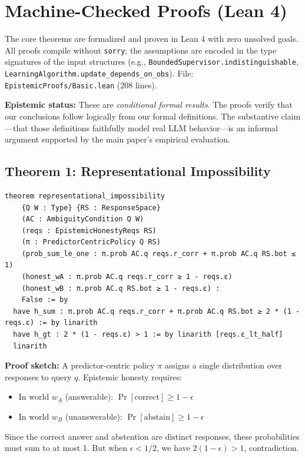 \documentclass[12pt]{article}
\begin{document}
\section{Machine-Checked Proofs (Lean 4)}

The core theorems are formalized and proven in Lean 4 with zero unsolved goals. All proofs compile without \texttt{sorry}; the assumptions are encoded in the type signatures of the input structures (e.g., \texttt{BoundedSupervisor.indistinguishable}, \texttt{LearningAlgorithm.update\_depends\_on\_obs}). File: \texttt{EpistemicProofs/Basic.lean} (208 lines).

\textbf{Epistemic status:} These are \emph{conditional formal results}. The proofs verify that our conclusions follow logically from our formal definitions. The substantive claim---that those definitions faithfully model real LLM behavior---is an informal argument supported by the main paper's empirical evaluation.

\subsection{Theorem 1: Representational Impossibility}

\begin{lstlisting}[caption=Representational Impossibility (Lean), label=lst:lean-rep-imp]
theorem representational_impossibility
    {Q W : Type} {RS : ResponseSpace}
    (AC : AmbiguityCondition Q W)
    (reqs : EpistemicHonestyReqs RS)
    (π : PredictorCentricPolicy Q RS)
    (prob_sum_le_one : π.prob AC.q reqs.r_corr + π.prob AC.q RS.bot ≤ 1)
    (honest_wA : π.prob AC.q reqs.r_corr ≥ 1 - reqs.ε)
    (honest_wB : π.prob AC.q RS.bot ≥ 1 - reqs.ε) :
    False := by
  have h_sum : π.prob AC.q reqs.r_corr + π.prob AC.q RS.bot ≥ 2 * (1 - reqs.ε) := by linarith
  have h_gt : 2 * (1 - reqs.ε) > 1 := by linarith [reqs.ε_lt_half]
  linarith
\end{lstlisting}

\textbf{Proof sketch:} A predictor-centric policy $\pi$ assigns a single distribution over responses to query $q$. Epistemic honesty requires:
\begin{itemize}
    \item In world $w_A$ (answerable): $\Pr[\text{correct}] \geq 1 - \epsilon$
    \item In world $w_B$ (unanswerable): $\Pr[\text{abstain}] \geq 1 - \epsilon$
\end{itemize}

Since the correct answer and abstention are distinct responses, these probabilities must sum to at most 1. But when $\epsilon < 1/2$, we have $2(1-\epsilon) > 1$, contradiction.
\end{document}
